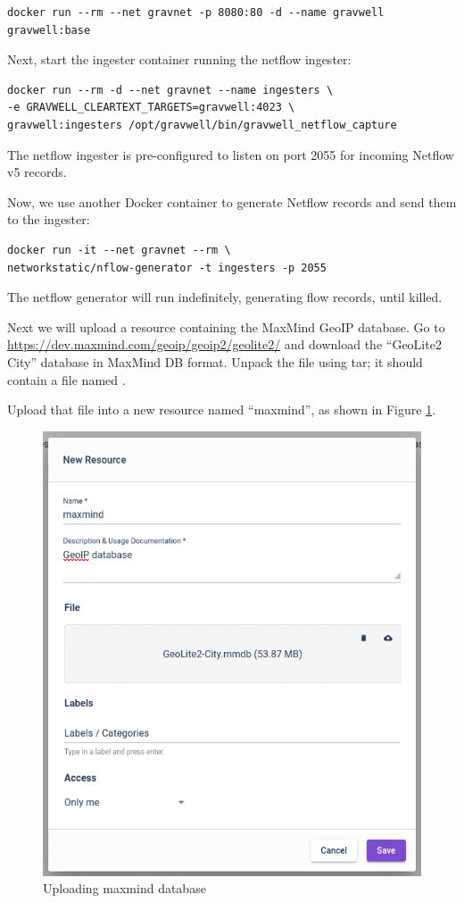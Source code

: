 \begin{Verbatim}[breaklines=true]
docker run --rm --net gravnet -p 8080:80 -d --name gravwell gravwell:base
\end{Verbatim}

Next, start the ingester container running the netflow ingester:

\begin{Verbatim}[breaklines=true]
docker run --rm -d --net gravnet --name ingesters \
-e GRAVWELL_CLEARTEXT_TARGETS=gravwell:4023 \
gravwell:ingesters /opt/gravwell/bin/gravwell_netflow_capture
\end{Verbatim}

The netflow ingester is pre-configured to listen on port 2055 for
incoming Netflow v5 records.

Now, we use another Docker container to generate Netflow records and
send them to the ingester:

\begin{Verbatim}[breaklines=true]
docker run -it --net gravnet --rm \
networkstatic/nflow-generator -t ingesters -p 2055
\end{Verbatim}

The netflow generator will run indefinitely, generating flow records,
until killed.

Next we will upload a resource containing the MaxMind GeoIP database.
Go to
\href{https://dev.maxmind.com/geoip/geoip2/geolite2}{https://dev.maxmind.com/geoip/geoip2/geolite2/} and
download the ``GeoLite2 City'' database in MaxMind DB format. Unpack the file
using tar; it should contain a file named .

Upload that file into a new resource named ``maxmind'', as shown in Figure \ref{fig:maxmind-upload}.

\begin{figure}[H]
	\includegraphics[width=0.5\linewidth]{images/maxmind-upload.png}
	\caption{Uploading maxmind database}
	\label{fig:maxmind-upload}
\end{figure}

